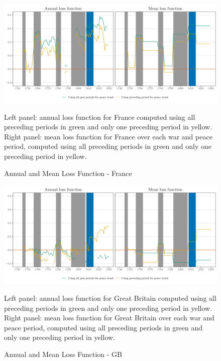 \documentclass[12pt,a4paper,notitlepage,english]{article}
\newcommand{\fontsmall}{\fontsize{10pt}{12pt}\selectfont}
\begin{document}
\begin{appendix}
\begin{figure}[h!]
\caption{Annual and Mean Loss Function - France}
\label{fig:mean_annual_loss}
\centering
\includegraphics[scale=.2]{mean_annual_loss}
\begin{minipage}{18cm}
\begin{flushleft}
\fontsmall
Left panel: annual loss function for France computed using all preceding periods in green and only one preceding period in yellow. 
Right panel: mean loss function for France over each war and peace period, computed using all preceding periods in green and only one preceding period in yellow. 
\end{flushleft}
\end{minipage}
\end{figure}

\begin{figure}[h!]
\caption{Annual and Mean Loss Function - GB}
\label{fig:GBmean_annual_loss}
\centering
\includegraphics[scale=0.2]{GBmean_annual_loss}
\begin{minipage}{18cm}
\begin{flushleft}
\fontsmall
Left panel: annual loss function for Great Britain computed using all preceding periods in green and only one preceding period in yellow. 
Right panel: mean loss function for Great Britain over each war and peace period, computed using all preceding periods in green and only one preceding period in yellow. 
\end{flushleft}
\end{minipage}
\end{figure}


\end{appendix}
\end{document}
